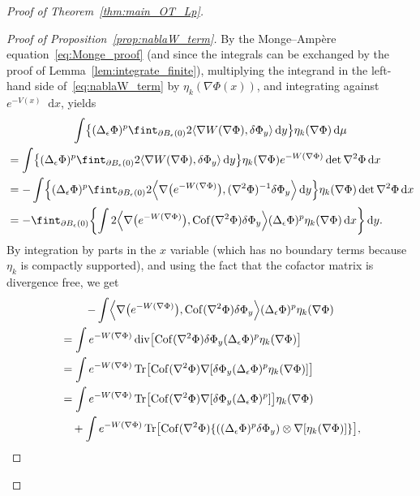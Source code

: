\documentclass[10pt]{amsart}
\theoremstyle{definition}\newtheorem{defi}[theo]{Definition}\newtheorem{rema}[theo]{Remark}\newtheorem{exam}[theo]{Example}\newtheorem{exem}[theo]{Example}\newtheorem{nota}[theo]{Notation}
\DeclareMathOperator{\Tr}{Tr}
\DeclareMathOperator{\Cof}{Cof}
\DeclareMathOperator{\Div}{div}
\newcommand{\V}{V}
\newcommand{\W}{W}
\newcommand{\source}{\mu}
\newcommand*\diff{\mathop{}\!\mathrm{d}}
\newcommand{\OT}{\Phi}
\newcommand{\avgint}{\fint}
\newcommand{\findiff}{\delta\OT}
\let\originalleft\left
\let\originalright\right
\renewcommand{\left}{\mathopen{}\mathclose\bgroup\originalleft}
\renewcommand{\right}{\aftergroup\egroup\originalright}
\begin{document}
\begin{proof}[Proof of Theorem~\ref{thm:main_OT_Lp}]
\begin{proof}[Proof of Proposition~\ref{prop:nablaW_term}]
By the Monge--Ampère equation~\eqref{eq:Monge_proof} (and since the integrals can be exchanged by the proof of Lemma~\ref{lem:integrate_finite}), multiplying the integrand in the left-hand side of~\eqref{eq:nablaW_term} by $\eta_k(\nabla\OT(x))$, and integrating against $e^{-\V(x)}\diff x$, yields
\begin{multline*}
\int\left\{ (\Delta_{\epsilon}\OT)^p\avgint_{\partial B_{\epsilon}(0)}2\langle \nabla\W(\nabla \OT),\findiff_y\rangle\diff y\right\}\eta_k(\nabla\OT)\diff \source\\
\begin{aligned}
&=\int\left\{ (\Delta_{\epsilon}\OT)^p\avgint_{\partial B_{\epsilon}(0)}2\langle \nabla\W(\nabla \OT),\findiff_y\rangle\diff y\right\}\eta_k(\nabla\OT)e^{-\W(\nabla\OT)}\det\nabla^2\OT\diff x\\
&=-\int\left\{ (\Delta_{\epsilon}\OT)^p\avgint_{\partial B_{\epsilon}(0)}2\left\langle \nabla\bigl(e^{-\W(\nabla\OT)}\bigr),(\nabla^2\OT)^{-1}\findiff_y\right\rangle\diff y\right\}\eta_k(\nabla\OT)\det\nabla^2\OT\diff x\\
&=-\avgint_{\partial B_{\epsilon}(0)}\left\{\int 2\left\langle \nabla\bigl(e^{-\W(\nabla\OT)}\bigr),\Cof(\nabla^2\OT)\findiff_y\right\rangle(\Delta_{\epsilon}\OT)^p\eta_k(\nabla\OT)\diff x\right\}\diff y.
\end{aligned}
\end{multline*}
By integration by parts in the $x$ variable (which has no boundary terms because $\eta_k$ is compactly supported), and using the fact that the cofactor matrix is divergence free, we get
\begin{multline*}
-\int \left\langle \nabla\bigl(e^{-\W(\nabla\OT)}\bigr),\Cof(\nabla^2\OT)\findiff_y\right\rangle(\Delta_{\epsilon}\OT)^p\eta_k(\nabla\OT)
\\
\begin{aligned}
&=\int e^{-\W(\nabla\OT)} \Div\left[\Cof(\nabla^2\OT)\findiff_y(\Delta_{\epsilon}\OT)^p\eta_k(\nabla\OT)\right]
\\
&=\int e^{-\W(\nabla\OT)} \Tr\left[\Cof(\nabla^2\OT)\nabla[\findiff_y(\Delta_{\epsilon}\OT)^p\eta_k(\nabla\OT)]\right]
\\
&=\int e^{-\W(\nabla\OT)} \Tr\left[\Cof(\nabla^2\OT)\nabla[\findiff_y(\Delta_{\epsilon}\OT)^p]\right]\eta_k(\nabla\OT)
\\
&\quad +\int e^{-\W(\nabla\OT)} \Tr\left[\Cof(\nabla^2\OT)\left\{\left((\Delta_{\epsilon}\OT)^p\findiff_y\right)\otimes\nabla[\eta_k(\nabla\OT)]\right\}\right],
\end{aligned}

\end{multline*}
\end{proof}
\end{proof}
\end{document}

